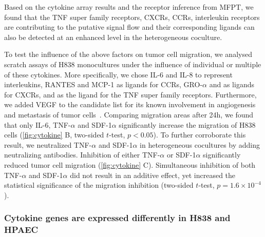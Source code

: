 Based on the cytokine array results and the receptor inference from MFPT, 
we found that the TNF super family receptors, CXCRs, CCRs,
interleukin receptors are contributing to the putative 
signal flow and their corresponding ligands can also be
detected at an enhanced level in the heterogeneous coculture.

To test the influence of the above factors on tumor cell migration,
we analysed scratch assays of H838 monocultures under the influence of 
individual or multiple of these cytokines. 
More specifically, we chose IL-6 and IL-8 to represent 
interleukins, RANTES and MCP-1 as ligands for CCRs, 
GRO-$\alpha$ and \sdfonea as ligands for CXCRs, and \tnfa
as the ligand for the TNF super family receptors.
Furthermore, we added VEGF to the candidate list for its known involvement in
angiogenesis and metastasis of tumor cells~\citep{Ferrara2003,Hiratsuka2002}. 
Comparing migration areas after 24h, 
we found that only IL-6, TNF-$\alpha$ and SDF-1$\alpha$ significantly 
increase the migration of H838 cells (\ref{fig:cytokine} B, two-sided $t$-test,
$p < 0.05$). 
To further corroborate this result, we neutralized 
TNF-$\alpha$ and SDF-1$\alpha$ in heterogeneous cocultures  by adding neutralizing antibodies.
Inhibition of  either TNF-$\alpha$ or SDF-1$\alpha$ significantly reduced tumor cell migration (\ref{fig:cytokine} C). 
Simultaneous inhibition of both TNF-$\alpha$ and SDF-1$\alpha$ did not result in an additive effect, yet increased the statistical significance of the migration 
inhibition
(two-sided $t$-test, $p=1.6\times10^{-4}$).

\subsubsection{Cytokine genes are expressed differently in H838 and HPAEC}

